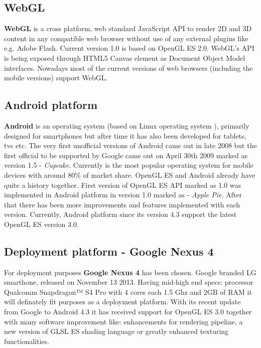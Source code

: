 \documentclass[a4paper,12pt]{article}
\begin{document}
\subsection{WebGL}
\textbf{WebGL} \cite{webgl_kronos} is a cross platform, web standard JavaScript API to render 2D and 3D content in any compatible web browser without use of any external plugins like e.g. Adobe Flash.
Current version 1.0 is based on OpenGL ES 2.0. WebGL's API is being exposed through HTML5 Canvas element as Document Object Model interfaces.
Nowadays most of the current versions of web browsers (including the mobile versions) support WebGL.

\subsection{Android platform}
\textbf{Android} \cite{androidcom} is an operating system (based on Linux operating system \cite{gnulinux}), primarily designed for smartphones but after time it has also been developed for tablets, tvs etc.
The very first unofficial versions of Android came out in late 2008 but the first official to be supported by Google came out on April 30th 2009 marked as version 1.5 - \textit{Cupcake}.
\newline Currently is the most popular operating system for mobile devices with around 80\% of market share.
OpenGL ES and Android already have quite a history together.
First version of OpenGL ES API marked as 1.0 was implemented in Android platform in version 1.0 marked as - \textit{Apple Pie}.
After that there has been more improvements and features implemented with each version. 
Currently, Android platform since its version 4.3 support the latest OpenGL ES version 3.0.

\subsection{Deployment platform - Google Nexus 4}
For deployment purposes \textbf{Google Nexus 4} has been chosen. Google branded LG smarthone, released on November 13 2013.
\newline Having mid-high end specs: processor Qualcomm Snapdragon™ S4 Pro with 4 cores each 1.5 Ghz and 2GB of RAM it will definately fit purposes as a deployment platform.
\newline With its recent update from Google to Android 4.3 it has received support for OpenGL ES 3.0 together with many software improvement like: enhancements for rendering pipeline, a new version of GLSL ES shading language or greatly enhanced texturing functionalities.
\end{document}
